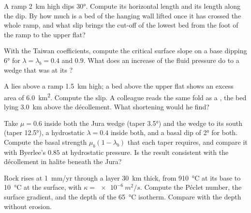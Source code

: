 \begin{exercise}[$\star$]\label{exo:b3:orogenic-wedges:4}
A ramp \qty{2}{km} high dips \ang{30}. Compute its horizontal length and its
length along the dip. By how much is a bed of the hanging wall lifted once it
has crossed the whole ramp, and what slip brings the cut-off of the lowest
bed from the foot of the ramp to the upper flat?
\end{exercise}

\begin{exercise}[$\star\star$]\label{exo:b3:orogenic-wedges:5}
With the Taiwan coefficients, compute the critical surface slope on a base
dipping \ang{6} for $\lambda = \lambda_b = 0.4$ and $0.9$. What does an
increase of the fluid pressure do to a wedge that was at its ?
\end{exercise}

\begin{exercise}[$\star\star$]\label{exo:b3:orogenic-wedges:6}
A  lies above a ramp \qty{1.5}{km} high; a bed above the upper
flat shows an excess area of \qty{6.0}{km^2}. Compute the slip. A colleague
reads the same fold as a , the bed lying \qty{3.0}{km} above
the décollement. What shortening would he find?
\end{exercise}

\begin{exercise}[$\star\star$]\label{exo:b3:orogenic-wedges:7}
Take $\mu = 0.6$ inside both the Jura wedge (taper \ang{3.5}) and the wedge to
its south (taper \ang{12.5}), a hydrostatic $\lambda = 0.4$ inside both, and a
basal dip of \ang{2} for both. Compute the basal strength $\mu_b(1 -
\lambda_b)$ that each taper requires, and compare it with Byerlee's $0.85$
at hydrostatic pressure. Is the result consistent with the décollement in
halite beneath the Jura?
\end{exercise}

\begin{exercise}[$\star\star$]\label{exo:b3:orogenic-wedges:8}
Rock rises at \qty{1}{mm/yr} through a layer \qty{30}{km} thick, from
\qty{910}{\celsius} at its base to \qty{10}{\celsius} at the surface, with
$\kappa = \qty{e-6}{m^2/s}$. Compute the Péclet number, the surface gradient,
and the depth of the \qty{65}{\celsius} isotherm. Compare with the depth
without erosion.
\end{exercise}

